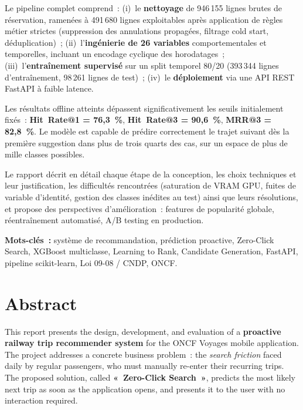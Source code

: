 \documentclass[11pt, a4paper]{article}
\begin{document}
Le pipeline complet comprend~: (i)~le \textbf{nettoyage} de 946\,155 lignes
brutes de réservation, ramenées à 491\,680 lignes exploitables après
application de règles métier strictes (suppression des annulations propagées,
filtrage cold start, déduplication)~; (ii)~l'\textbf{ingénierie de 26
variables} comportementales et temporelles, incluant un encodage cyclique des
horodatages~; (iii)~l'\textbf{entraînement supervisé} sur un split temporel
80/20 (393\,344 lignes d'entraînement, 98\,261 lignes de test)~; (iv)~le
\textbf{déploiement} via une API REST FastAPI à faible latence.

Les résultats offline atteints dépassent significativement les seuils
initialement fixés~:
\textbf{Hit~Rate@1 = 76{,}3~\%}, \textbf{Hit~Rate@3 = 90{,}6~\%},
\textbf{MRR@3 = 82{,}8~\%}. Le modèle est capable de prédire correctement le
trajet suivant dès la première suggestion dans plus de trois quarts des cas,
sur un espace de plus de mille classes possibles.

Le rapport décrit en détail chaque étape de la conception, les choix
techniques et leur justification, les difficultés rencontrées (saturation de
VRAM GPU, fuites de variable d'identité, gestion des classes inédites au test)
ainsi que leurs résolutions, et propose des perspectives d'amélioration~:
features de popularité globale, réentraînement automatisé, A/B testing en
production.

\bigskip
\noindent\textbf{Mots-clés~:} système de recommandation, prédiction proactive,
Zero-Click Search, XGBoost multiclasse, Learning to Rank, Candidate
Generation, FastAPI, pipeline scikit-learn, Loi 09-08 / CNDP, ONCF.

\newpage
\section*{Abstract}

This report presents the design, development, and evaluation of a
\textbf{proactive railway trip recommender system} for the ONCF Voyages
mobile application. The project addresses a concrete business problem~: the
\textit{search friction} faced daily by regular passengers, who must manually
re-enter their recurring trips. The proposed solution, called
\textbf{«~Zero-Click Search~»}, predicts the most likely next trip as soon as
the application opens, and presents it to the user with no interaction
required.
\end{document}
